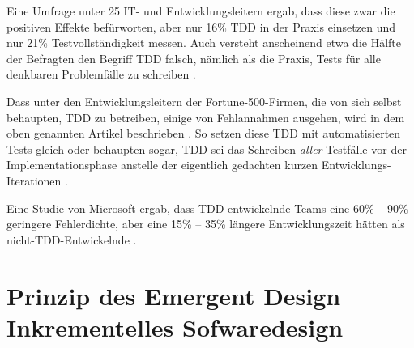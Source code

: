 Eine Umfrage unter 25 IT- und Entwicklungsleitern ergab, dass diese zwar die positiven Effekte befürworten, aber nur 16\% TDD in der Praxis einsetzen und nur 21\% Testvollständigkeit messen. Auch versteht anscheinend etwa die Hälfte der Befragten den Begriff TDD falsch, nämlich als die Praxis, Tests für alle denkbaren Problemfälle zu schreiben \citep{stelligent_inc_stelligent_2007}.

Dass unter den Entwicklungsleitern der Fortune-500-Firmen, die von sich selbst behaupten, TDD zu betreiben, einige von Fehlannahmen ausgehen, wird in dem oben genannten Artikel beschrieben \citep{janzen_does_2008}. So setzen diese TDD mit automatisierten Tests gleich oder behaupten sogar, TDD sei das Schreiben \textit{aller} Testfälle vor der Implementationsphase anstelle der eigentlich gedachten kurzen Entwicklungs-Iterationen \citep{janzen_does_2008}.


Eine Studie von Microsoft ergab, dass TDD-entwickelnde Teams eine 60\% -- 90\% geringere Fehlerdichte, aber eine 15\% -- 35\% längere Entwicklungszeit hätten als nicht-TDD-Entwickelnde \citep{nagappan_realizing_2008}.



\section{Prinzip des Emergent Design -- Inkrementelles Sofwaredesign}
\label{sec:tddEmergent}





